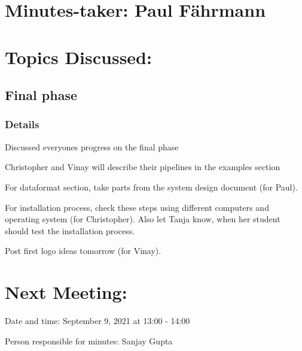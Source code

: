 \documentclass[11pt]{meetingmins} %
\begin{document}
\maketitle

\section{Minutes-taker: Paul Fährmann}

\section{Topics Discussed:}

\subsection{Final phase}
\subsubsection{Details}
\begin{hiddensubitems}
    \item Discussed everyones progress on the final phase
    \item Christopher and Vinay will describe their pipelines in the examples section
    \item For dataformat section, take parts from the system design document (for Paul).
    \item For installation process, check these steps using different computers and operating system (for Christopher). Also let Tanja know, when her student should test the installation process.
    \item Post first logo ideas tomorrow (for Vinay).
\end{hiddensubitems}

\section{Next Meeting:}
\begin{hiddensubitems}
    \item Date and time: September 9, 2021 at 13:00 - 14:00
    \item Person responsible for minutes: Sanjay Gupta
\end{hiddensubitems}
\end{document}
